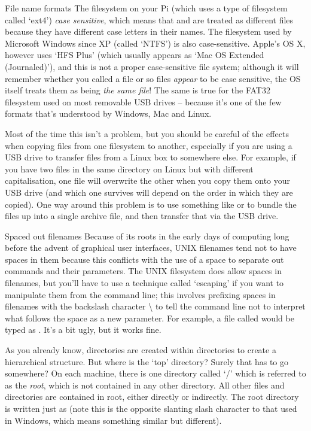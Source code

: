 \begin{danger}{File name formats}
The filesystem on your Pi (which uses a type of filesystem called `ext4') \textit{case sensitive}, which means that  and  are treated as different files because they have different case letters in their names. The filesystem used by Microsoft Windows since XP (called `NTFS') is also case-sensitive. Apple's OS X, however uses `HFS Plus' (which usually appears as `Mac OS Extended (Journaled)'), and this is not a proper case-sensitive file system; although it will remember whether you called a file  or  so files \textit{appear} to be case sensitive, the OS itself treats them as being \textit{the same file}! The same is true for the FAT32 filesystem used on most removable USB drives -- because it's one of the few formats that's understood by Windows, Mac and Linux. 

Most of the time this isn't a problem, but you should be careful of the effects when copying files from one filesystem to another, especially if you are using a USB drive to transfer files from a Linux box to somewhere else. For example, if you have two files in the same directory on Linux but with different capitalisation, one file will overwrite the other when you copy them onto your USB drive (and which one survives will depend on the order in which they are copied). One way around this problem is to use something like  or  to bundle the files up into a single archive file, and then transfer that via the USB drive. 
\end{danger}

\begin{linux}{Spaced out filenames}
Because of its roots in the early days of computing long before the advent of graphical user interfaces, UNIX filenames tend not to have spaces in them because this conflicts with the use of a space to separate out commands and their parameters. The UNIX filesystem does allow spaces in filenames, but you'll have to use a technique called `escaping' if you want to manipulate them from the command line; this involves prefixing spaces in filenames with the backslash character \textbackslash{} to tell the command line not to interpret what follows the space as a new parameter. For example, a file called  would be typed as . It's a bit ugly, but it works fine. 
\end{linux} 

As you already know, directories are created within directories to create a hierarchical structure. But where is the `top' directory? Surely that has to go somewhere? On each machine, there is one directory called `/' which is referred to as the \textit{root}, which is not contained in any other directory. All other files and directories are contained in root, either directly or indirectly. The root directory is written just as \fname{/} (note this is the opposite slanting slash character to that used in Windows, which means something similar but different). 

